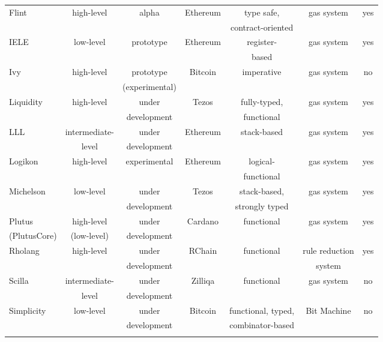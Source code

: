 \begin{appendices}
\begin{ThreePartTable}
\begin{longtable}{  l @{\extracolsep{\fill}} *{6}{c} }
Flint & high-level & alpha & Ethereum & type safe, & {\centering gas system} & yes\\
& & & & contract-oriented& &\\
\addlinespace

IELE & low-level & prototype & Ethereum & register- & gas system & yes\\
& & & & based & &\\
\addlinespace

Ivy & high-level& prototype & Bitcoin & imperative & gas system & no\\
& & (experimental) & & & & \\
\addlinespace

Liquidity & high-level & under & Tezos & fully-typed, & gas system & yes\\
& & development & & functional & & \\
\addlinespace

LLL & intermediate-& under & Ethereum & stack-based & gas system & yes\\
& level & development & & & & \\
\addlinespace

Logikon & high-level & experimental & Ethereum & logical- & gas system & yes\\
& & & & functional & & \\
\addlinespace

Michelson & low-level & under & Tezos & stack-based, & gas system & yes\\
& & development & & strongly typed & & \\
\addlinespace

Plutus & high-level & under & Cardano & functional & gas system & yes\\
(PlutusCore) & (low-level) & development & & & & \\
\addlinespace

Rholang & high-level& under & RChain & functional & rule reduction & yes\\
& & development & & & system & \\
\addlinespace

Scilla & intermediate-& under & Zilliqa & functional & gas system & no\\
& level & development & & & & \\
\addlinespace

Simplicity & low-level & under & Bitcoin & functional, typed, & Bit Machine & no \\
& & development & & combinator-based & & \\
\addlinespace


\end{longtable}
\end{ThreePartTable}
\end{appendices}
